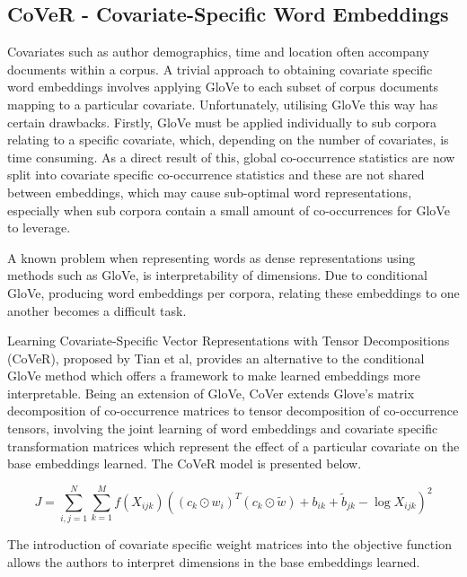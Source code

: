 \subsection{CoVeR - Covariate-Specific Word Embeddings}
Covariates such as author demographics, time and location often accompany documents within a corpus. A trivial approach to obtaining covariate specific word embeddings involves applying GloVe to each subset of corpus documents mapping to a particular covariate. Unfortunately, utilising GloVe this way has certain drawbacks. Firstly, GloVe must be applied individually to sub corpora relating to a specific covariate, which, depending on the number of covariates, is time consuming. As a direct result of this, global co-occurrence statistics are now split into covariate specific co-occurrence statistics and these are not shared between embeddings, which may cause sub-optimal word representations, especially when sub corpora contain a small amount of co-occurrences for GloVe to leverage. 

\noindent
\newline
A known problem when representing words as dense representations using methods such as GloVe, is interpretability of dimensions. Due to conditional GloVe, producing word embeddings per corpora, relating these embeddings to one another becomes a difficult task. 


\noindent
\newline
Learning Covariate-Specific Vector Representations with Tensor Decompositions (CoVeR), proposed by Tian et al, provides an alternative to the conditional GloVe method which offers a framework to make learned embeddings more interpretable. Being an extension of GloVe, CoVer extends Glove's matrix decomposition of co-occurrence matrices to tensor decomposition of co-occurrence tensors, involving the joint learning of word embeddings and covariate specific transformation matrices which represent the effect of a particular covariate on the base embeddings learned. The CoVeR model is presented below.

\begin{equation}
J = \sum_{i, j=1}^{N} \sum_{k=1}^{M} f(X_{ijk}) ((c_{k} \odot w_{i})^{T} (c_{k} \odot \tilde{w}) + b_{ik} + \tilde{b}_{jk} - \log{X_{ijk}})^{2}
\end{equation}

\noindent
\newline
The introduction of covariate specific weight matrices into the objective function allows the authors to interpret dimensions in the base embeddings learned. 


